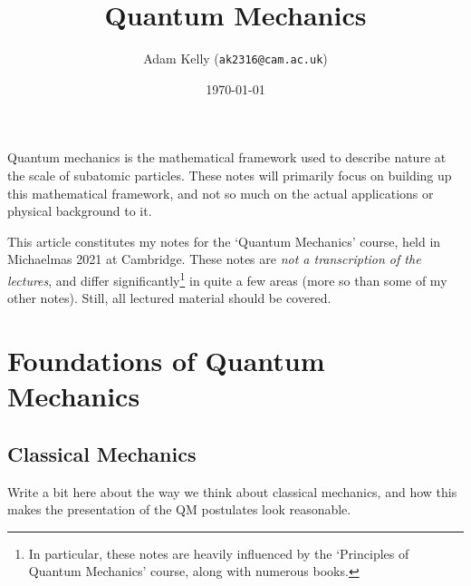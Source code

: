 \documentclass[a4paper]{scrartcl}
\title{Quantum Mechanics}
\author{Adam Kelly (\texttt{ak2316@cam.ac.uk})}
\date{\today}
\begin{document}
\maketitle


Quantum mechanics is the mathematical framework used to describe nature at the scale of subatomic particles. These notes will primarily focus on building up this mathematical framework, and not so much on the actual applications or physical background to it.

This article constitutes my notes for the `Quantum Mechanics' course, held in Michaelmas 2021 at Cambridge. These notes are \emph{not a transcription of the lectures}, and differ significantly\footnote{In particular, these notes are heavily influenced by the `Principles of Quantum Mechanics' course, along with numerous books.} in quite a few areas (more so than some of my other notes). Still, all lectured material should be covered.





\tableofcontents

\section{Foundations of Quantum Mechanics}

\subsection{Classical Mechanics}

Write a bit here about the way we think about classical mechanics, and how this makes the presentation of the QM postulates look reasonable.
\end{document}
